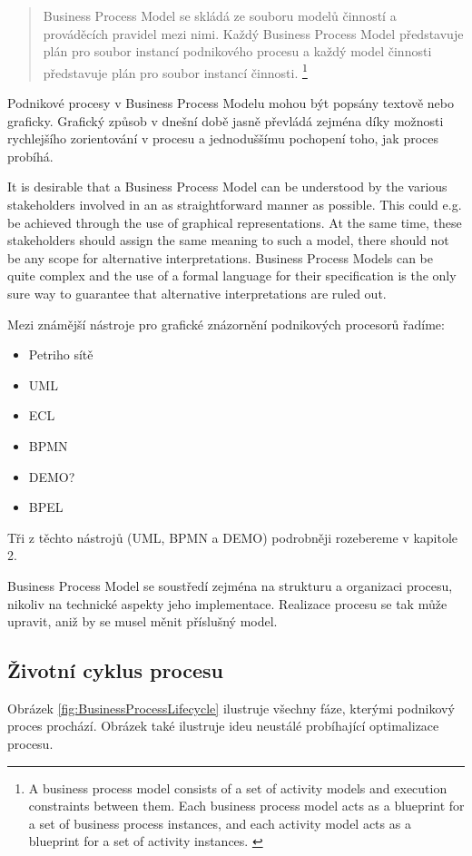 \documentclass[]{article}
\begin{document}
\begin{quote}
Business Process Model se skládá ze souboru modelů činností a prováděcích pravidel mezi nimi. Každý Business Process Model představuje plán pro soubor instancí podnikového procesu a každý model činnosti představuje plán pro soubor instancí činnosti.
\footnote{A business process model consists of a set of activity models and execution constraints between them. Each business process model acts as a blueprint for a set of business process instances, and each activity model acts as a blueprint for a set of activity instances. \cite{Weske2007}}
\end{quote}

Podnikové procesy v Business Process Modelu mohou být popsány textově nebo graficky. Grafický způsob v dnešní době jasně převládá zejména díky možnosti rychlejšího zorientování v procesu a jednoduššímu pochopení toho, jak proces probíhá.

It is desirable that a Business Process Model can be understood by the various stakeholders involved in an as straightforward manner as possible. This could e.g. be achieved through the use of graphical representations. At the same time, these stakeholders should assign the same meaning to such a model, there should not be any scope for alternative interpretations. Business Process Models can be quite complex and the use of a formal language for their specification is the only sure way to guarantee that alternative interpretations are ruled out. 

Mezi známější nástroje pro grafické znázornění podnikových procesorů řadíme: \cite{Naplava2015}
\begin{itemize}
\item Petriho sítě
\item UML
\item ECL
\item BPMN
\item DEMO?
\item BPEL
\end{itemize}

Tři z těchto nástrojů (UML, BPMN a DEMO) podrobněji rozebereme v kapitole 2. %

Business Process Model se soustředí zejména na strukturu a organizaci procesu, nikoliv na technické aspekty jeho implementace. Realizace procesu se tak může upravit, aniž by se musel měnit příslušný model.

\subsection{Životní cyklus procesu}
Obrázek \ref{fig:BusinessProcessLifecycle} ilustruje všechny fáze, kterými podnikový proces prochází. Obrázek také ilustruje ideu neustálé probíhající optimalizace procesu.
\end{document}
